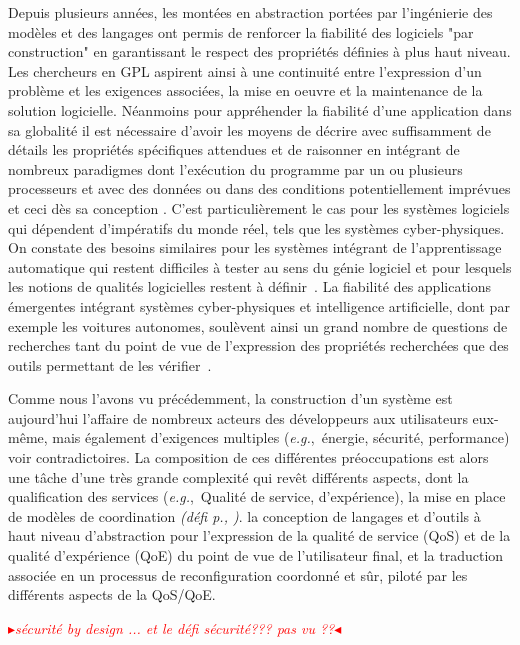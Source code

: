 \documentclass[11pt]{article}
\newcommand{\mynote}[3][black]{\textcolor{#1}{\fbox{\bfseries\sffamily\scriptsize{#2}}
{\small$\blacktriangleright$\textsf{\emph{#3}}$\blacktriangleleft$}}}
\newcommand{\TODO}[1]{\mynote[red]{TODO}{#1}}
\newcommand{\eg}[0]{\emph{e.g.},~}
\newcommand{\defi}[1]{\emph{(défi p.\pageref{#1}, \cite{#1})}}
\begin{document}
Depuis plusieurs années, les montées en abstraction portées par l'ingénierie des modèles et des langages ont permis de renforcer la fiabilité des logiciels "par construction" en garantissant le respect des propriétés définies à plus haut niveau. Les chercheurs en GPL aspirent ainsi à une continuité entre l'expression d'un problème et les exigences associées, la mise en oeuvre et la maintenance de la solution logicielle.
Néanmoins pour appréhender la fiabilité d'une application dans sa globalité il est nécessaire d'avoir les moyens de décrire avec suffisamment de détails les propriétés spécifiques attendues et de raisonner en intégrant de nombreux paradigmes dont l’exécution du programme par un ou plusieurs processeurs et avec des données ou dans des conditions potentiellement imprévues et ceci dès sa conception \cite{reconfiguration, compilation}. 
C'est particulièrement le cas pour les systèmes logiciels qui dépendent d'impératifs du monde réel, tels que les systèmes cyber-physiques. On constate des besoins similaires pour les systèmes intégrant de l'apprentissage automatique qui restent difficiles à tester au sens du génie logiciel et pour lesquels les notions de qualités logicielles restent à définir~\cite{IA}.  La fiabilité des  applications émergentes intégrant  systèmes cyber-physiques et intelligence artificielle, dont par exemple les voitures autonomes, soulèvent ainsi un grand nombre de questions de recherches tant du point de vue de l'expression des propriétés recherchées que des outils permettant de les vérifier~\cite{emergents}.

Comme nous l'avons vu précédemment, la construction d'un système est aujourd'hui l'affaire de nombreux acteurs des développeurs aux utilisateurs eux-même, mais également d'exigences multiples (\eg énergie, sécurité, performance) voir contradictoires. La composition de ces différentes préoccupations est alors une tâche d'une très grande complexité qui revêt différents aspects, dont la qualification des services (\eg Qualité de service, d'expérience), la mise en place de modèles de coordination \defi{reconfiguration}.
la conception de langages et d'outils à haut niveau d'abstraction pour l'expression de la qualité de service (QoS) et de la qualité d'expérience (QoE) du point de vue de l'utilisateur final, et la traduction associée en un processus de reconfiguration coordonné et sûr, piloté par les différents aspects de la QoS/QoE.



\TODO{sécurité by design ... et le défi sécurité??? pas vu ??}
\end{document}
